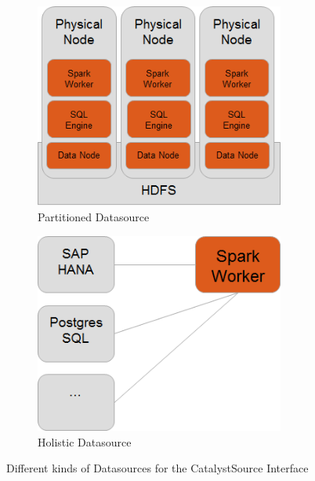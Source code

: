 \documentclass{article}
\begin{document}
\begin{figure}
\centering
\begin{subfigure}{.5\textwidth}
  \centering
  \includegraphics[width=0.9\textwidth]{images/partitionedDS.png}
  \caption{Partitioned Datasource}
  \label{fig:partitionedDS}
\end{subfigure}%
\begin{subfigure}{.5\textwidth}
  \centering
  \includegraphics[width=0.9\textwidth]{images/holisticDS.png}
  \caption{Holistic Datasource}
  \label{fig:holisticDS}
\end{subfigure}
\caption{Different kinds of Datasources for the CatalystSource Interface}
\label{fig:partitionedVsHolistic}
\end{figure}
\end{document}
